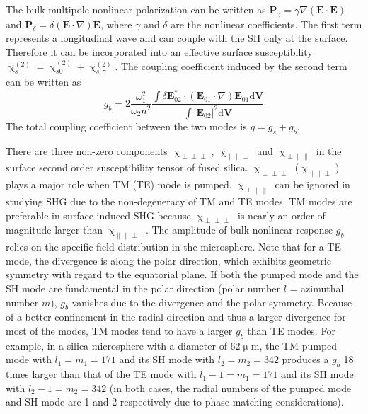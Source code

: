 \documentclass[a4paper,8pt,hyperref, twocolumn]{article}
\begin{document}
The bulk multipole nonlinear polarization can be written as $\mathbf{P}_\gamma =  \gamma\nabla(\mathbf{E}\cdot\mathbf{E})$ and $\mathbf{P}_\delta =  \delta(\mathbf{E}\cdot\nabla)\mathbf{E}$, where $\gamma$ and $\delta$ are the nonlinear coefficients. The first term represents a longitudinal wave and can couple with the SH only at the surface. Therefore it can be incorporated into an effective surface susceptibility $\upchi^{(2)}_s = \upchi^{(2)}_{s0}+\upchi^{(2)}_{s,\gamma}$\cite{heinz1991second}. The coupling coefficient induced by the second term can be written as %
\begin{equation}
g_b =  2\frac{\omega_1^2}{\omega_2n^2}\frac{\int \delta\mathbf{E}_{02}^* \cdot (\mathbf{E}_{01}\cdot\nabla)\mathbf{E}_{01} \mathrm{d}	\mathbf{V}}{\int |\mathbf{E}_{02}|^2 \mathrm{d} \mathbf{V}}
\label{eq:gb}
\end{equation}
The total coupling coefficient between the two modes is $g = g_s+g_b$. 

There are three non-zero components $\upchi_{\perp \perp \perp}$, $\upchi_{\parallel \parallel \perp}$ and $\upchi_{\perp \parallel \parallel}$ in the surface second order susceptibility tensor of fused silica.  $\upchi_{\perp \perp \perp}$ ($\upchi_{\parallel \parallel \perp}$) plays a major role when TM (TE) mode is pumped. $\upchi_{\perp \parallel \parallel}$ can be ignored in studying SHG due to the non-degeneracy of TM and TE modes. TM modes are preferable in surface induced SHG because $\upchi_{\perp \perp \perp}$ is nearly an order of magnitude larger than $\upchi_{\parallel \parallel \perp}$ \cite{rodriguez2008calibration}. The amplitude of bulk nonlinear response $g_b$ relies on the specific field distribution in the microsphere.  Note that for a TE mode, the divergence is along the polar direction, which exhibits geometric symmetry with regard to the equatorial plane. If both the pumped mode and the SH mode are fundamental in the polar direction (polar number $l$ = azimuthal number $m$), $g_b$ vanishes due to the divergence and the polar symmetry. Because of a better confinement in the radial direction and thus a larger divergence for most of the modes, TM modes tend to have a larger $g_b$ than TE modes. For example, in a silica microsphere with a diameter of 62$\upmu$m, the TM pumped mode with $l_1=m_1=171$ and its SH mode with $l_2=m_2=342$ produces a $g_b$ 18 times larger than that of the TE mode with $l_1-1=m_1=171$ and its SH mode with $l_2-1=m_2=342$ (in both cases, the radial numbers of the pumped mode and SH mode are 1 and 2 respectively due to phase matching considerations). 
\end{document}
